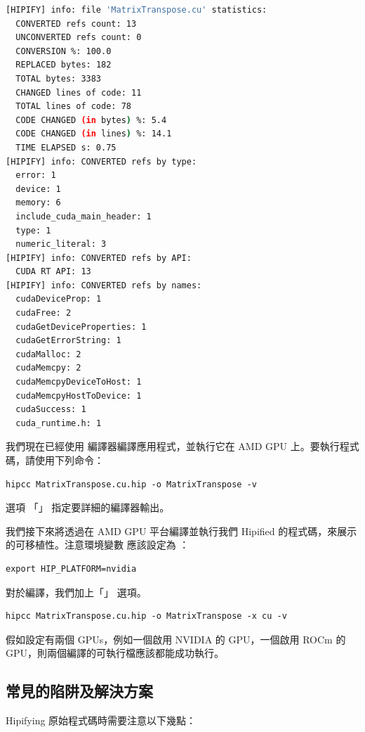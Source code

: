 \begin{lstlisting}[language=bash, caption={矩陣轉置的 HIP 轉換統計資料}, label={lst:Matrix-transpose HIP conversion statistics}]
[HIPIFY] info: file 'MatrixTranspose.cu' statistics:
  CONVERTED refs count: 13
  UNCONVERTED refs count: 0
  CONVERSION %: 100.0
  REPLACED bytes: 182
  TOTAL bytes: 3383
  CHANGED lines of code: 11
  TOTAL lines of code: 78
  CODE CHANGED (in bytes) %: 5.4
  CODE CHANGED (in lines) %: 14.1
  TIME ELAPSED s: 0.75
[HIPIFY] info: CONVERTED refs by type:
  error: 1
  device: 1
  memory: 6
  include_cuda_main_header: 1
  type: 1
  numeric_literal: 3
[HIPIFY] info: CONVERTED refs by API:
  CUDA RT API: 13
[HIPIFY] info: CONVERTED refs by names:
  cudaDeviceProp: 1
  cudaFree: 2
  cudaGetDeviceProperties: 1
  cudaGetErrorString: 1
  cudaMalloc: 2
  cudaMemcpy: 2
  cudaMemcpyDeviceToHost: 1
  cudaMemcpyHostToDevice: 1
  cudaSuccess: 1
  cuda_runtime.h: 1
\end{lstlisting}

我們現在已經使用  編譯器編譯應用程式，並執行它在 AMD GPU 上。要執行程式碼，請使用下列命令：

\begin{lstlisting}
hipcc MatrixTranspose.cu.hip -o MatrixTranspose -v
\end{lstlisting}

選項 「」 指定要詳細的編譯器輸出。

我們接下來將透過在 AMD GPU 平台編譯並執行我們 Hipified 的程式碼，來展示  的可移植性。注意環境變數  應該設定為 ：

\begin{lstlisting}
export HIP_PLATFORM=nvidia
\end{lstlisting}

對於編譯，我們加上「」 選項。

\begin{lstlisting}
hipcc MatrixTranspose.cu.hip -o MatrixTranspose -x cu -v
\end{lstlisting}

假如設定有兩個 GPUs，例如一個啟用 NVIDIA 的 GPU，一個啟用 ROCm 的 GPU，則兩個編譯的可執行檔應該都能成功執行。

\subsection{常見的陷阱及解決方案}

Hipifying  原始程式碼時需要注意以下幾點：

